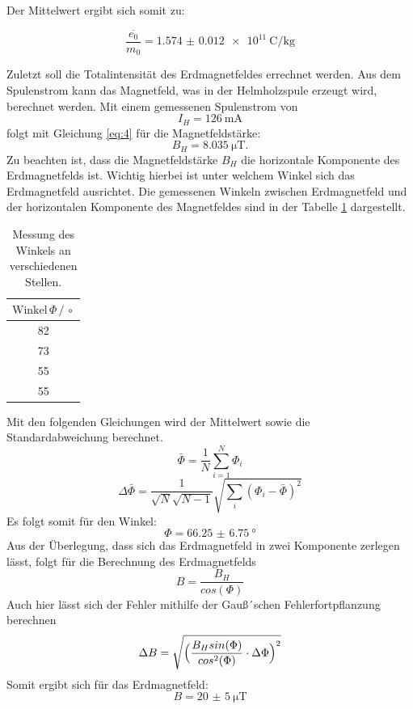 Der Mittelwert ergibt sich somit zu:

\begin{equation*}
  \overline{\frac{e_0}{m_0}} = \SI{1.574(12)e11}{\coulomb\per\kilo\gram}
\end{equation*}

Zuletzt soll die Totalintensität des Erdmagnetfeldes errechnet werden.
Aus dem Spulenstrom kann das Magnetfeld, was in der Helmholzspule erzeugt wird,
berechnet werden.
Mit einem gemessenen Spulenstrom von
\begin{equation*}
  I_H =\SI{126}{\milli\ampere}
\end{equation*}
folgt mit Gleichung \ref{eq:4} für die Magnetfeldstärke:
\begin{equation*}
  B_H =\SI{8.035}{\micro\tesla}.
\end{equation*}
Zu beachten ist, dass die Magnetfeldstärke $B_H$ die horizontale Komponente des Erdmagnetfelds ist.
Wichtig hierbei ist unter welchem Winkel sich das Erdmagnetfeld ausrichtet.
Die gemessenen Winkeln zwischen Erdmagnetfeld und der horizontalen Komponente des Magnetfeldes
sind in der Tabelle \ref{tab:7} dargestellt.
\begin{table}[H]
  \centering
  \caption{Messung des Winkels an verschiedenen Stellen.}
  \label{tab:7}
  \begin{tabular}{c}
\toprule
$\text{Winkel}\, \Phi \,/\, \circ$\\
\midrule
82\\
73\\
55\\
55\\
\bottomrule
  \end{tabular}
\end{table}
Mit den folgenden Gleichungen wird der Mittelwert sowie die Standardabweichung berechnet.
\begin{equation*}
  \bar{\Phi}= \frac{1}{N} \sum_{i=1}^{N} \Phi_{i}
\end{equation*}
\begin{equation*}
\Delta \bar{\Phi} = \frac{1}{\sqrt{N}\sqrt{N-1}} \sqrt{\sum_{i}(\Phi_{i}-\bar{\Phi})^2}
\end{equation*}
Es folgt somit für den Winkel:
\begin{equation*}
  \Phi = \SI{66.25(675)}{\degree}
\end{equation*}
Aus der Überlegung, dass sich das Erdmagnetfeld in zwei Komponente zerlegen lässt, folgt für die Berechnung des Erdmagnetfelds
\begin{equation*}
  B = \frac{B_H}{cos(\Phi)}
\end{equation*}
Auch hier lässt sich der Fehler mithilfe der Gauß´schen Fehlerfortpflanzung berechnen
\begin{equation*}
  \Delta B = \sqrt{\Bigl(\frac{B_H sin(\Phi)}{cos^2(\Phi)} \cdot \Delta \Phi\Bigr)^2}
\end{equation*}
Somit ergibt sich für das Erdmagnetfeld:
\begin{equation*}
  B= \SI{20(5)}{\micro\tesla}
\end{equation*}
